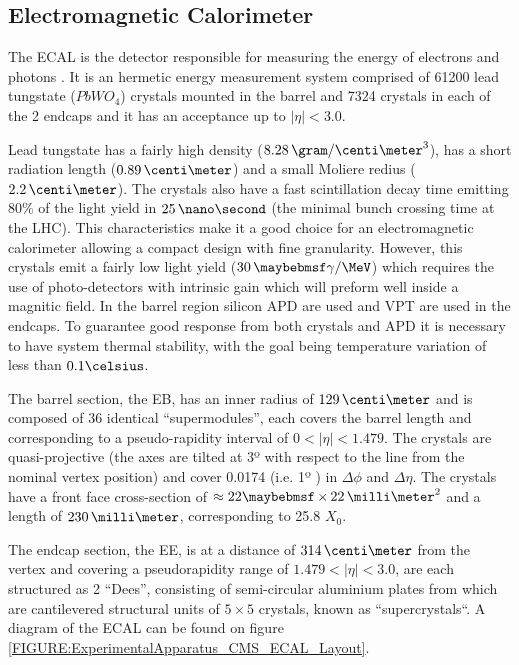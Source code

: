 \subsection{Electromagnetic Calorimeter}
\label{SUBSECTION:ExperimentalApparatus_CMS_ECAL}


The \gls{ECAL} is the detector responsible for measuring the energy of electrons and photons \cite{CMSTDR:CMSECAL,CMSTDR:CMSECALAddendum}. It is an hermetic energy measurement system comprised of 61200 lead tungstate ($PbWO_4$) crystals mounted in the barrel and 7324 crystals in each of the 2 endcaps and it has an acceptance up to $|\eta|<3.0$.

Lead tungstate has a fairly high density ($8.28\,\gram/\centi\meter^3$), has a short radiation length ($0.89\,\centi\meter$) and a small Moliere redius ($2.2\,\centi\meter$). The crystals also have a fast scintillation decay time emitting 80\% of the light yield in $25\,\nano\second$ (the minimal bunch crossing time at the \gls{LHC}). This characteristics make it a good choice for an electromagnetic calorimeter allowing a compact design with fine granularity. However, this crystals emit a fairly low light yield ($30\,\gamma/\MeV$) which requires the use of photo-detectors with intrinsic gain which will preform well inside a magnitic field. In the barrel region silicon \gls{APD} are used and \gls{VPT} are used in the endcaps. To guarantee good response from both crystals and \gls{APD} it is necessary to have system thermal stability, with the goal being temperature variation of less than $0.1 \celsius$.

The barrel section, the \gls{EB}, has an inner radius of $129\,\centi\meter$ and is composed of 36 identical ``supermodules'', each covers the barrel length and corresponding to a pseudo-rapidity interval of $0<|\eta|<1.479$. The crystals are quasi-projective (the axes are tilted at 3º with respect to the line from the nominal vertex position) and cover 0.0174 (i.e. 1º ) in $\Delta\phi$ and $\Delta\eta$. The crystals have a front face cross-section of $\approx 22 \times 22\,\milli\meter^2$ and a length of $230\,\milli\meter$, corresponding to 25.8 $X_0$.

The endcap section, the \gls{EE}, is at a distance of $314\,\centi\meter$ from the vertex and covering a pseudorapidity range of $1.479<|\eta|<3.0$, are each structured as 2 ``Dees'', consisting of semi-circular aluminium plates from which are cantilevered structural units of $5\times 5$ crystals, known as ``supercrystals``. A diagram of the \gls{ECAL} can be found on figure \ref{FIGURE:ExperimentalApparatus_CMS_ECAL_Layout}.

